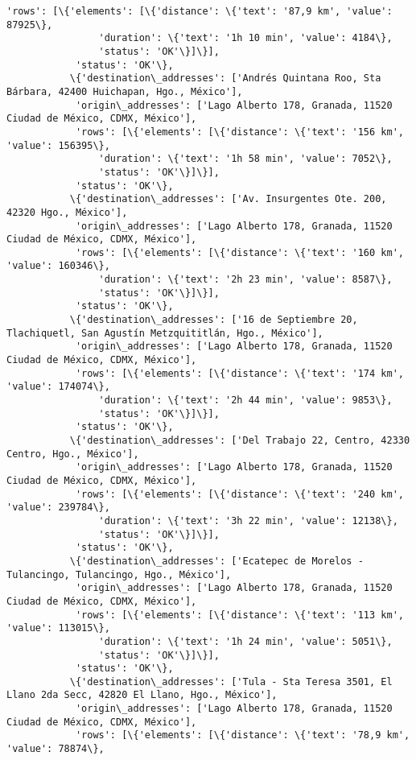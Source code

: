 \documentclass[11pt]{article}
\begin{document}
\begin{Verbatim}[commandchars=\\\{\}]
            'rows': [\{'elements': [\{'distance': \{'text': '87,9 km', 'value': 87925\},
                'duration': \{'text': '1h 10 min', 'value': 4184\},
                'status': 'OK'\}]\}],
            'status': 'OK'\},
           \{'destination\_addresses': ['Andrés Quintana Roo, Sta Bárbara, 42400 Huichapan, Hgo., México'],
            'origin\_addresses': ['Lago Alberto 178, Granada, 11520 Ciudad de México, CDMX, México'],
            'rows': [\{'elements': [\{'distance': \{'text': '156 km', 'value': 156395\},
                'duration': \{'text': '1h 58 min', 'value': 7052\},
                'status': 'OK'\}]\}],
            'status': 'OK'\},
           \{'destination\_addresses': ['Av. Insurgentes Ote. 200, 42320 Hgo., México'],
            'origin\_addresses': ['Lago Alberto 178, Granada, 11520 Ciudad de México, CDMX, México'],
            'rows': [\{'elements': [\{'distance': \{'text': '160 km', 'value': 160346\},
                'duration': \{'text': '2h 23 min', 'value': 8587\},
                'status': 'OK'\}]\}],
            'status': 'OK'\},
           \{'destination\_addresses': ['16 de Septiembre 20, Tlachiquetl, San Agustín Metzquititlán, Hgo., México'],
            'origin\_addresses': ['Lago Alberto 178, Granada, 11520 Ciudad de México, CDMX, México'],
            'rows': [\{'elements': [\{'distance': \{'text': '174 km', 'value': 174074\},
                'duration': \{'text': '2h 44 min', 'value': 9853\},
                'status': 'OK'\}]\}],
            'status': 'OK'\},
           \{'destination\_addresses': ['Del Trabajo 22, Centro, 42330 Centro, Hgo., México'],
            'origin\_addresses': ['Lago Alberto 178, Granada, 11520 Ciudad de México, CDMX, México'],
            'rows': [\{'elements': [\{'distance': \{'text': '240 km', 'value': 239784\},
                'duration': \{'text': '3h 22 min', 'value': 12138\},
                'status': 'OK'\}]\}],
            'status': 'OK'\},
           \{'destination\_addresses': ['Ecatepec de Morelos - Tulancingo, Tulancingo, Hgo., México'],
            'origin\_addresses': ['Lago Alberto 178, Granada, 11520 Ciudad de México, CDMX, México'],
            'rows': [\{'elements': [\{'distance': \{'text': '113 km', 'value': 113015\},
                'duration': \{'text': '1h 24 min', 'value': 5051\},
                'status': 'OK'\}]\}],
            'status': 'OK'\},
           \{'destination\_addresses': ['Tula - Sta Teresa 3501, El Llano 2da Secc, 42820 El Llano, Hgo., México'],
            'origin\_addresses': ['Lago Alberto 178, Granada, 11520 Ciudad de México, CDMX, México'],
            'rows': [\{'elements': [\{'distance': \{'text': '78,9 km', 'value': 78874\},

\end{Verbatim}
\end{document}
